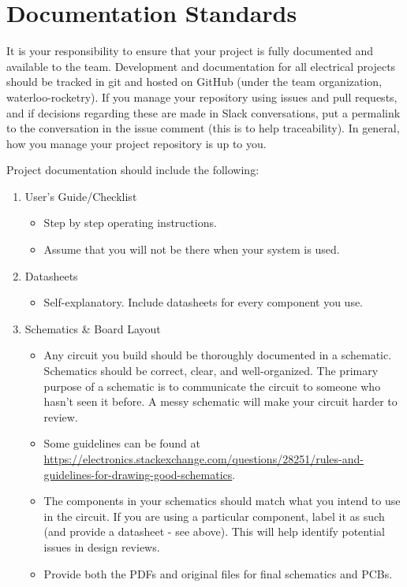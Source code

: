 \documentclass{article}
\begin{document}
\section{Documentation Standards}
It is your responsibility to ensure that your project is fully documented and available to the team. Development and documentation for all electrical projects should be tracked in git and hosted on GitHub (under the team organization, waterloo-rocketry). If you manage your repository using issues and pull requests, and if decisions regarding these are made in Slack conversations, put a permalink to the conversation in the issue comment (this is to help traceability). In general, how you manage your project repository is up to you.

Project documentation should include the following:

\begin{enumerate}
\item User's Guide/Checklist
\begin{itemize}
\item Step by step operating instructions.
\item Assume that you will not be there when your system is used.
\end{itemize}
\item Datasheets
\begin{itemize}
\item Self-explanatory. Include datasheets for every component you use.
\end{itemize}
\item Schematics \& Board Layout
\begin{itemize}
\item Any circuit you build should be thoroughly documented in a schematic. Schematics should be correct, clear, and well-organized. The primary purpose of a schematic is to communicate the circuit to someone who hasn't seen it before. A messy schematic will make your circuit harder to review.
\item Some guidelines can be found at \url{https://electronics.stackexchange.com/questions/28251/rules-and-guidelines-for-drawing-good-schematics}.
\item The components in your schematics should match what you intend to use in the circuit. If you are using a particular component, label it as such (and provide a datasheet - see above). This will help identify potential issues in design reviews.
\item Provide both the PDFs and original files for final schematics and PCBs.
\end{itemize}
\end{enumerate}
\end{document}
